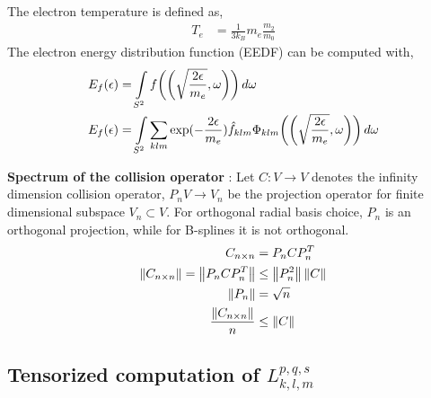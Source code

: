 \documentclass{article}[draft]
\begin{document}
The electron temperature is defined as, 
\begin{align*}
T_e & = \frac{1}{3k_B} m_e \frac{m_2}{m_0}
\end{align*}
The electron energy distribution function (EEDF) can be computed with, 
\begin{align*}
E_f(\epsilon) &= \myint_{S^2} f\of{\left(\sqrt{\frac{2\epsilon}{m_e}},\omega\right)} \diff{\omega} \\
E_f(\epsilon) &= \myint_{S^2} \sum_{klm} \exp(-\frac{2\epsilon}{m_e}) \hat{f}_{klm} \Phi_{klm}\of{\left(\sqrt{\frac{2\epsilon}{m_e}},\omega\right)} \diff{\omega}
\end{align*}


\textbf{Spectrum of the collision operator} : Let $C : V \rightarrow V$ denotes the infinity dimension collision operator, $P_n V \rightarrow V_n$ be the projection operator for finite dimensional subspace $V_n \subset V$. For orthogonal radial basis choice, $P_n$ is an orthogonal projection, while for B-splines it is not orthogonal.
\begin{align*}
C_{n\times n} &= P_n C P_n^T \\
\left\lVert C_{n\times n}\right\rVert = \left\lVert P_n C P_n^T\right\rVert &\leq \left\lVert P_n^2\right\rVert\left\lVert C\right\rVert \\
\left\lVert P_n\right\rVert &=\sqrt{n} \\
\frac{\left\lVert C_{n\times n}\right\rVert}{n} &\leq \left\lVert C\right\rVert
\end{align*}

\subsection{Tensorized computation of ${L}_{k,l,m}^{p,q,s}$}
\end{document}
